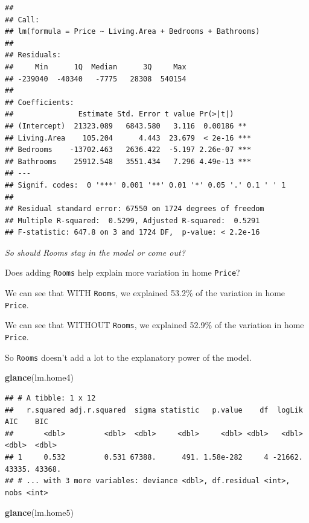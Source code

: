 \documentclass[
]{book}
\newenvironment{Shaded}{\begin{snugshade}}{\end{snugshade}}
\newcommand{\KeywordTok}[1]{\textcolor[rgb]{0.13,0.29,0.53}{\textbf{#1}}}
\newcommand{\NormalTok}[1]{#1}
\begin{document}
\begin{verbatim}
## 
## Call:
## lm(formula = Price ~ Living.Area + Bedrooms + Bathrooms)
## 
## Residuals:
##     Min      1Q  Median      3Q     Max 
## -239040  -40340   -7775   28308  540154 
## 
## Coefficients:
##               Estimate Std. Error t value Pr(>|t|)    
## (Intercept)  21323.089   6843.580   3.116  0.00186 ** 
## Living.Area    105.204      4.443  23.679  < 2e-16 ***
## Bedrooms    -13702.463   2636.422  -5.197 2.26e-07 ***
## Bathrooms    25912.548   3551.434   7.296 4.49e-13 ***
## ---
## Signif. codes:  0 '***' 0.001 '**' 0.01 '*' 0.05 '.' 0.1 ' ' 1
## 
## Residual standard error: 67550 on 1724 degrees of freedom
## Multiple R-squared:  0.5299,	Adjusted R-squared:  0.5291 
## F-statistic: 647.8 on 3 and 1724 DF,  p-value: < 2.2e-16
\end{verbatim}

\emph{So should Rooms stay in the model or come out?}

Does adding \texttt{Rooms} help explain more variation in home \texttt{Price}?

We can see that WITH \texttt{Rooms}, we explained 53.2\% of the variation in home \texttt{Price}.

We can see that WITHOUT \texttt{Rooms}, we explained 52.9\% of the variation in home \texttt{Price}.

So \texttt{Rooms} doesn't add a lot to the explanatory power of the model.

\begin{Shaded}
\begin{Highlighting}[]
\KeywordTok{glance}\NormalTok{(lm.home4)}
\end{Highlighting}
\end{Shaded}

\begin{verbatim}
## # A tibble: 1 x 12
##   r.squared adj.r.squared  sigma statistic   p.value    df  logLik    AIC    BIC
##       <dbl>         <dbl>  <dbl>     <dbl>     <dbl> <dbl>   <dbl>  <dbl>  <dbl>
## 1     0.532         0.531 67388.      491. 1.58e-282     4 -21662. 43335. 43368.
## # ... with 3 more variables: deviance <dbl>, df.residual <int>, nobs <int>
\end{verbatim}

\begin{Shaded}
\begin{Highlighting}[]
\KeywordTok{glance}\NormalTok{(lm.home5)}
\end{Highlighting}
\end{Shaded}
\end{document}
